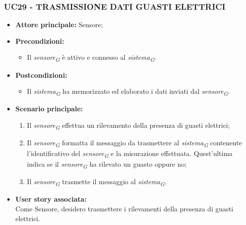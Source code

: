 \subsubsection{UC29 - TRASMISSIONE DATI GUASTI ELETTRICI}
\begin{itemize}
    \item \textbf{Attore principale:} Sensore;
    \item \textbf{Precondizioni:}
        \begin{itemize}
            \item Il \textit{sensore}\textsubscript{\textit{G}} è attivo e connesso al \textit{sistema}\textsubscript{\textit{G}}. 
        \end{itemize}
    \item \textbf{Postcondizioni:}
        \begin{itemize}
            \item Il \textit{sistema}\textsubscript{\textit{G}} ha memorizzato ed elaborato i dati inviati dal \textit{sensore}\textsubscript{\textit{G}}.
        \end{itemize}
    \item \textbf{Scenario principale:}
        \begin{enumerate}
            \item Il \textit{sensore}\textsubscript{\textit{G}} effettua un rilevamento della presenza di guasti elettrici;
            \item Il \textit{sensore}\textsubscript{\textit{G}} formatta il messaggio da trasmettere al \textit{sistema}\textsubscript{\textit{G}} contenente l'identificativo del \textit{sensore}\textsubscript{\textit{G}} e la misurazione effettuata. Quest'ultima indica se il \textit{sensore}\textsubscript{\textit{G}} ha rilevato un guasto oppure no;
            \item Il \textit{sensore}\textsubscript{\textit{G}} trasmette il messaggio al \textit{sistema}\textsubscript{\textit{G}}.
        \end{enumerate}
    \item \textbf{User story associata:} \\
    Come Sensore, desidero trasmettere i rilevamenti della presenza di guasti elettrici.
\end{itemize}
